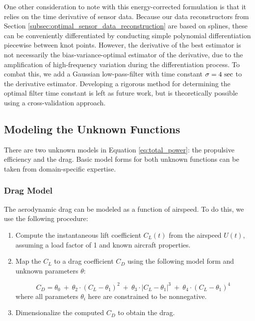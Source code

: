 \documentclass[conf]{new-aiaa}
\begin{document}
    One other consideration to note with this energy-corrected formulation is that it relies on the time derivative of sensor data. Because our data reconstructors from Section \ref{subsec:optimal_sensor_data_reconstruction} are based on splines, these can be conveniently differentiated by conducting simple polynomial differentiation piecewise between knot points. However, the derivative of the best estimator is not necessarily the bias-variance-optimal estimator of the derivative, due to the amplification of high-frequency variation during the differentiation process. To combat this, we add a Gaussian low-pass-filter with time constant $\sigma=4\ \rm sec$ to the derivative estimator. Developing a rigorous method for determining the optimal filter time constant is left as future work, but is theoretically possible using a cross-validation approach.

    \subsection{Modeling the Unknown Functions}
    \label{subsec:modeling_unknown_functions}

    There are two unknown models in Equation \ref{eq:total_power}: the propulsive efficiency and the drag. Basic model forms for both unknown functions can be taken from domain-specific expertise.

    \subsubsection{Drag Model}
    \label{subsubsec:drag_model}
    The aerodynamic drag can be modeled as a function of airspeed. To do this, we use the following procedure:

    \begin{enumerate}
        \item Compute the instantaneous lift coefficient $C_L(t)$ from the airspeed $U(t)$, assuming a load factor of 1 and known aircraft properties.
        \item Map the $C_L$ to a drag coefficient $C_D$ using the following model form and unknown parameters $\theta$:

        \begin{equation*}
            C_D =
            \theta_0
            \: + \: \theta_2 \cdot (C_L - \theta_1)^2
            \: + \: \theta_3 \cdot |C_L - \theta_1|^3
            \: + \: \theta_4 \cdot (C_L - \theta_1)^4
            \label{eq:drag_coefficient}
        \end{equation*}
        \noindent where all parameters $\theta_i$ here are constrained to be nonnegative.
        \item Dimensionalize the computed $C_D$ to obtain the drag.
    \end{enumerate}
\end{document}
